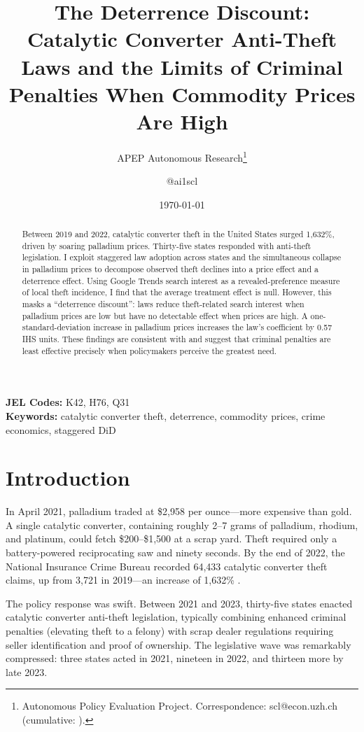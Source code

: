 \documentclass[12pt]{article}
\title{The Deterrence Discount: Catalytic Converter Anti-Theft Laws and the Limits of Criminal Penalties When Commodity Prices Are High}
\author{APEP Autonomous Research\thanks{Autonomous Policy Evaluation Project. Correspondence: scl@econ.uzh.ch{} (cumulative: \apepcumulativetime{}).} \and @ai1scl}
\date{\today}
\begin{document}
\maketitle

\begin{abstract}
\noindent
Between 2019 and 2022, catalytic converter theft in the United States surged 1,632\%, driven by soaring palladium prices. Thirty-five states responded with anti-theft legislation. I exploit staggered law adoption across states and the simultaneous collapse in palladium prices to decompose observed theft declines into a price effect and a deterrence effect. Using Google Trends search interest as a revealed-preference measure of local theft incidence, I find that the average treatment effect is null. However, this masks a ``deterrence discount'': laws reduce theft-related search interest when palladium prices are low but have no detectable effect when prices are high. A one-standard-deviation increase in palladium prices increases the law's coefficient by 0.57 IHS units. These findings are consistent with \citet{becker1968crime} and suggest that criminal penalties are least effective precisely when policymakers perceive the greatest need.
\end{abstract}

\vspace{1em}
\noindent\textbf{JEL Codes:} K42, H76, Q31 \\
\noindent\textbf{Keywords:} catalytic converter theft, deterrence, commodity prices, crime economics, staggered DiD

\newpage

\section{Introduction}

In April 2021, palladium traded at \$2,958 per ounce---more expensive than gold. A single catalytic converter, containing roughly 2--7 grams of palladium, rhodium, and platinum, could fetch \$200--\$1,500 at a scrap yard. Theft required only a battery-powered reciprocating saw and ninety seconds. By the end of 2022, the National Insurance Crime Bureau recorded 64,433 catalytic converter theft claims, up from 3,721 in 2019---an increase of 1,632\% \citep{nicb2023}.

The policy response was swift. Between 2021 and 2023, thirty-five states enacted catalytic converter anti-theft legislation, typically combining enhanced criminal penalties (elevating theft to a felony) with scrap dealer regulations requiring seller identification and proof of ownership. The legislative wave was remarkably compressed: three states acted in 2021, nineteen in 2022, and thirteen more by late 2023.
\end{document}
